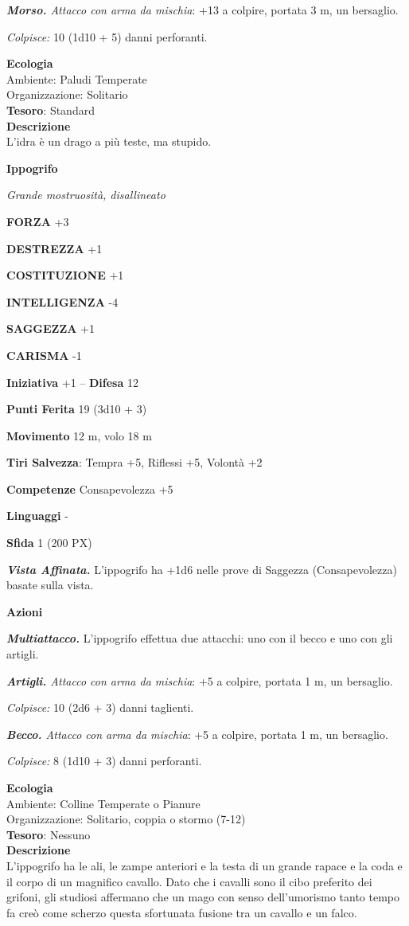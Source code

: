 \begin{multicols}{2}
	\textit{\textbf{Morso.} Attacco con arma da mischia}: +13 a colpire, portata 3 m, un bersaglio.

	\textit{Colpisce:} 10 (1d10 + 5) danni perforanti.

	\textbf{Ecologia}\\
	Ambiente: Paludi Temperate\\
	Organizzazione: Solitario\\
	\textbf{Tesoro}: Standard\\
	\textbf{Descrizione}\\
	L'idra è un drago a più teste, ma stupido.


	\medskip{}\textbf{Ippogrifo}

	\textit{Grande mostruosità, disallineato}

	\textbf{FORZA} +3

	\textbf{DESTREZZA} +1

	\textbf{COSTITUZIONE} +1

	\textbf{INTELLIGENZA} -4

	\textbf{SAGGEZZA} +1

	\textbf{CARISMA} -1

	\textbf{Iniziativa} +1 -- \textbf{Difesa} 12

	\textbf{Punti Ferita} 19 (3d10 + 3)

	\textbf{Movimento} 12 m, volo 18 m

	\textbf{Tiri Salvezza}: Tempra +5, Riflessi +5, Volontà +2

	\textbf{Competenze} Consapevolezza +5

	\textbf{Linguaggi} -

	\textbf{Sfida} 1 (200 PX)

	\textit{\textbf{Vista Affinata.}} L'ippogrifo ha +1d6 nelle prove di Saggezza (Consapevolezza) basate sulla vista.

	\textbf{Azioni}

	\textit{\textbf{Multiattacco.}} L'ippogrifo effettua due attacchi: uno con il becco e uno con gli artigli.

	\textit{\textbf{Artigli.} Attacco con arma da mischia}: +5 a colpire, portata 1 m, un bersaglio.

	\textit{Colpisce:} 10 (2d6 + 3) danni taglienti.

	\textit{\textbf{Becco.} Attacco con arma da mischia}: +5 a colpire, portata 1 m, un bersaglio.

	\textit{Colpisce:} 8 (1d10 + 3) danni perforanti.

	\textbf{Ecologia}\\
	Ambiente: Colline Temperate o Pianure\\
	Organizzazione: Solitario, coppia o stormo (7-12)\\
	\textbf{Tesoro}: Nessuno\\
	\textbf{Descrizione}\\
	L'ippogrifo ha le ali, le zampe anteriori e la testa di un grande rapace e la coda e il corpo di un magnifico cavallo. Dato che i cavalli sono il cibo preferito dei grifoni, gli studiosi affermano che un mago con senso dell'umorismo tanto tempo fa creò come scherzo questa sfortunata fusione tra un cavallo e un falco.


\end{multicols}

